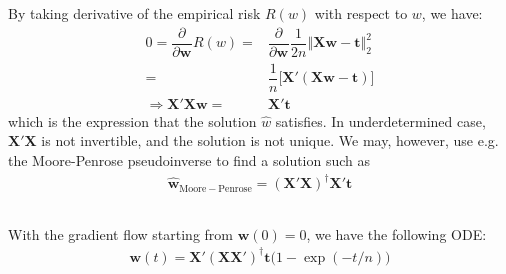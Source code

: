 \documentclass[11pt,a4paper]{ctexart}
\numberwithin{equation}{section}%
\begin{document}
By taking derivative of the empirical risk $ R(w) $ with respect to $ w $, we have:
\begin{align*}
    0=\dfrac{\partial^{}  }{\partial \mathbf{w}^{} }R(w)=& \dfrac{\partial^{}  }{\partial \mathbf{w}^{} }\dfrac{ 1 }{ 2n }\left\Vert \mathbf{X}\mathbf{w}-\mathbf{t} \right\Vert _2^2\\
    =& \dfrac{ 1 }{ n }\big[ \mathbf{X}'(\mathbf{X}\mathbf{w}-\mathbf{t}) \big] \\
     \Rightarrow \mathbf{X}'\mathbf{X}\mathbf{w}=& \mathbf{X}'\mathbf{t}
\end{align*}
which is the expression that the solution $ \hat{w} $ satisfies. In underdetermined case, $ \mathbf{X}'\mathbf{X} $ is not invertible, and the solution is not unique. We may, however, use e.g. the Moore-Penrose pseudoinverse to find a solution such as
\begin{align*}
    \hat{\mathbf{w}}_{\mathrm{ Moore-Penrose } }=(\mathbf{X}'\mathbf{X})^{\dagger}\mathbf{X}'\mathbf{t}
\end{align*}




\subsection{}

With the gradient flow starting from $ \mathbf{w}(0)=0 $, we have the following ODE:
\begin{align*}
    \mathbf{w}(t)=\mathbf{X}'(\mathbf{X}\mathbf{X}')^\dagger\mathbf{t}\big( 1-\exp(-t/n) \big)
\end{align*}
\end{document}

